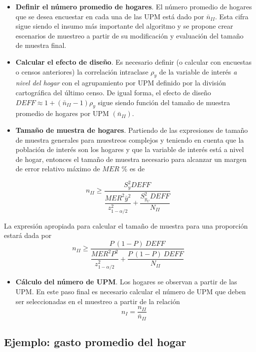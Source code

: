 \documentclass[
  12pt,
]{book}
\providecommand{\tightlist}{%
  \setlength{\itemsep}{0pt}\setlength{\parskip}{0pt}}
\begin{document}
\begin{itemize}
\item
  \textbf{Definir el número promedio de hogares}. El número promedio de hogares que se desea encuestar en cada una de las UPM está dado por \(\bar{n}_{II}\). Esta cifra sigue siendo el insumo más importante del algoritmo y se propone crear escenarios de muestreo a partir de su modificación y evaluación del tamaño de muestra final.
\item
  \textbf{Calcular el efecto de diseño}. Es necesario definir (o calcular con encuestas o censos anteriores) la correlación intraclase \(\rho_y\) de la variable de interés \emph{a nivel del hogar} con el agrupamiento por UPM definido por la división cartográfica del último censo. De igual forma, el efecto de diseño \(DEFF \approx 1 + (\bar{n}_{II} - 1)\rho_y\) sigue siendo función del tamaño de muestra promedio de hogares por UPM \((\bar{n}_{II})\).
\item
  \textbf{Tamaño de muestra de hogares}. Partiendo de las expresiones de tamaño de muestra generales para muestreos complejos y teniendo en cuenta que la población de interés son los hogares y que la variable de interés está a nivel de hogar, entonces el tamaño de muestra necesario para alcanzar un margen de error relativo máximo de \(MER\) \% es de
\end{itemize}

\[
n_{II} \geq \dfrac{S^2_{y}DEFF}{\dfrac{MER^2 \bar{y}^2}{z_{1-\alpha/2}^2}+\dfrac{S^2_{y_U}DEFF}{N_{II}}}
\]

La expresión apropiada para calcular el tamaño de muestra para una proporción estará dada por
\[
n_{II} \geq \dfrac{P\ (1-P)\ DEFF}{\dfrac{MER^2P^2}{z_{1-\alpha/2}^2}+\dfrac{P\ (1-P) \ DEFF}{N_{II}}}
\]

\begin{itemize}
\tightlist
\item
  \textbf{Cálculo del número de UPM}. Los hogares se observan a partir de las UPM. En este paso final es necesario calcular el número de UPM que deben ser seleccionadas en el muestreo a partir de la relación
  \[
  n_{I} = \frac{n_{II}}{\bar{n}_{II}}
  \]
\end{itemize}

\hypertarget{ejemplo-gasto-promedio-del-hogar}{%
\subsection{Ejemplo: gasto promedio del hogar}\label{ejemplo-gasto-promedio-del-hogar}}
\end{document}
